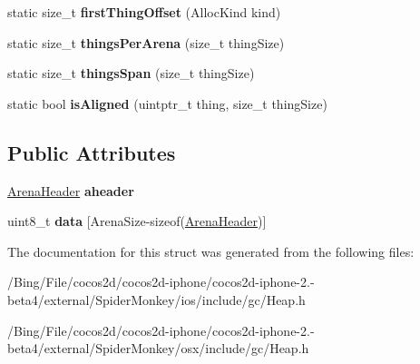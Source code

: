 \begin{DoxyCompactItemize}
\item 
\hypertarget{structjs_1_1gc_1_1_arena_aa6f4ad7523f0304e607c7c1e2e11c529}{static size\-\_\-t {\bfseries first\-Thing\-Offset} (Alloc\-Kind kind)}\label{structjs_1_1gc_1_1_arena_aa6f4ad7523f0304e607c7c1e2e11c529}

\item 
\hypertarget{structjs_1_1gc_1_1_arena_a17f2d552fece242df408d08fbe5d527a}{static size\-\_\-t {\bfseries things\-Per\-Arena} (size\-\_\-t thing\-Size)}\label{structjs_1_1gc_1_1_arena_a17f2d552fece242df408d08fbe5d527a}

\item 
\hypertarget{structjs_1_1gc_1_1_arena_a37f6e77deca908eeff8296d8ed51febb}{static size\-\_\-t {\bfseries things\-Span} (size\-\_\-t thing\-Size)}\label{structjs_1_1gc_1_1_arena_a37f6e77deca908eeff8296d8ed51febb}

\item 
\hypertarget{structjs_1_1gc_1_1_arena_a5f966fe2c6cee04082b62fcd9b72f64c}{static bool {\bfseries is\-Aligned} (uintptr\-\_\-t thing, size\-\_\-t thing\-Size)}\label{structjs_1_1gc_1_1_arena_a5f966fe2c6cee04082b62fcd9b72f64c}

\end{DoxyCompactItemize}
\subsection*{Public Attributes}
\begin{DoxyCompactItemize}
\item 
\hypertarget{structjs_1_1gc_1_1_arena_a02cfa1eb691a9b9133f976e5807762cd}{\hyperlink{structjs_1_1gc_1_1_arena_header}{Arena\-Header} {\bfseries aheader}}\label{structjs_1_1gc_1_1_arena_a02cfa1eb691a9b9133f976e5807762cd}

\item 
\hypertarget{structjs_1_1gc_1_1_arena_a18ced0fc7d81d4b3f4fb5a5534f89957}{uint8\-\_\-t {\bfseries data} \mbox{[}Arena\-Size-\/sizeof(\hyperlink{structjs_1_1gc_1_1_arena_header}{Arena\-Header})\mbox{]}}\label{structjs_1_1gc_1_1_arena_a18ced0fc7d81d4b3f4fb5a5534f89957}

\end{DoxyCompactItemize}


The documentation for this struct was generated from the following files\-:\begin{DoxyCompactItemize}
\item 
/\-Bing/\-File/cocos2d/cocos2d-\/iphone/cocos2d-\/iphone-\/2.-\/beta4/external/\-Spider\-Monkey/ios/include/gc/Heap.\-h\item 
/\-Bing/\-File/cocos2d/cocos2d-\/iphone/cocos2d-\/iphone-\/2.-\/beta4/external/\-Spider\-Monkey/osx/include/gc/Heap.\-h\end{DoxyCompactItemize}
